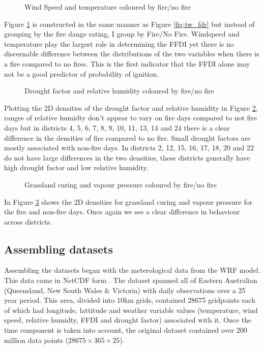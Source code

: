 \documentclass[11pt,a4paper]{article}
\begin{document}
\begin{figure}[h]
	\centering 
	\caption{Wind Speed and temperature coloured by fire/no fire} 
	\label{fig:tw_fire} 
\end{figure}

Figure \ref{fig:tw_fire} is constructed in the same manner as Figure \ref{fig:tw_fdr} but instead of grouping by the fire dange rating, I group by Fire/No Fire. Windspeed and temperature play the largest role in determining the FFDI yet there is no discernable difference between the distributions of the two variables when there is a fire compared to no fires. This is the first indicator that the FFDI alone may not be a good predictor of probability of ignition. 

\begin{figure}[h]
	\centering 
	\caption{Drought factor and relative humidity coloured by fire/no fire} 
	\label{fig:dh_fire} 
\end{figure}

Plotting the 2D densities of the drought factor and relative humidity in Figure \ref{fig:dh_fire}, ranges of relative humidty don't appear to vary on fire days compared to not fire days but in districts 4, 5, 6, 7, 8, 9, 10, 11, 13, 14 and 24 there is a clear difference in the densities of fire compared to no fire. Small drought factors are mostly associated with non-fire days. In districts 2, 12, 15, 16, 17, 18, 20 and 22 do not have large differences in the two densities, these districts generally have high drought factor and low relative humidity. 

\begin{figure}[h]
	\centering 
	\caption{Grassland curing and vapour pressure coloured by fire/no fire} 
	\label{fig:gv_fire} 
\end{figure}

In Figure \ref{fig:gv_fire} shows the 2D densities for grassland curing and vapour pressure for the fire and non-fire days. Once again we see a clear difference in behaviour across districts.  

\subsection{Assembling datasets}

Assembling the datasets began with the meterological data from the WRF model. This data came in NetCDF form \citep{ncdf}. The dataset spanned all of Eastern Australian (Queensland, New South Wales \& Victoria) with daily observations over a 25 year period. This area, divided into 10km grids, contained 28675 gridpoints each of which had longitude, lattitude and weather variable values (temperature, wind speed, relative humidty, FFDI and drought factor) associated with it. Once the time component is taken into account, the original dataset contained over 200 million data points ($28675 \times 365 \times 25$). 
\end{document}
